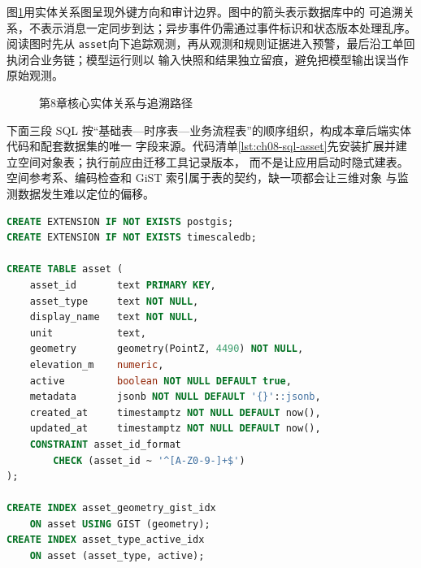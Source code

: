 图\ref{fig:ch08-database-er}用实体关系图呈现外键方向和审计边界。图中的箭头表示数据库中的
可追溯关系，不表示消息一定同步到达；异步事件仍需通过事件标识和状态版本处理乱序。阅读图时先从
\texttt{asset}向下追踪观测，再从观测和规则证据进入预警，最后沿工单回执闭合业务链；模型运行则以
输入快照和结果独立留痕，避免把模型输出误当作原始观测。

\begin{figure}[H]
\centering
{}
\caption{第8章核心实体关系与追溯路径}
\label{fig:ch08-database-er}
\end{figure}

下面三段 SQL 按“基础表—时序表—业务流程表”的顺序组织，构成本章后端实体代码和配套数据集的唯一
字段来源。代码清单\ref{lst:ch08-sql-asset}先安装扩展并建立空间对象表；执行前应由迁移工具记录版本，
而不是让应用启动时隐式建表。空间参考系、编码检查和 GiST 索引属于表的契约，缺一项都会让三维对象
与监测数据发生难以定位的偏移。

\begin{lstlisting}[label={lst:ch08-sql-asset},language=SQL,caption={空间对象表与空间索引 DDL}]
CREATE EXTENSION IF NOT EXISTS postgis;
CREATE EXTENSION IF NOT EXISTS timescaledb;

CREATE TABLE asset (
    asset_id       text PRIMARY KEY,
    asset_type     text NOT NULL,
    display_name   text NOT NULL,
    unit           text,
    geometry       geometry(PointZ, 4490) NOT NULL,
    elevation_m    numeric,
    active         boolean NOT NULL DEFAULT true,
    metadata       jsonb NOT NULL DEFAULT '{}'::jsonb,
    created_at     timestamptz NOT NULL DEFAULT now(),
    updated_at     timestamptz NOT NULL DEFAULT now(),
    CONSTRAINT asset_id_format
        CHECK (asset_id ~ '^[A-Z0-9-]+$')
);

CREATE INDEX asset_geometry_gist_idx
    ON asset USING GIST (geometry);
CREATE INDEX asset_type_active_idx
    ON asset (asset_type, active);
\end{lstlisting}

